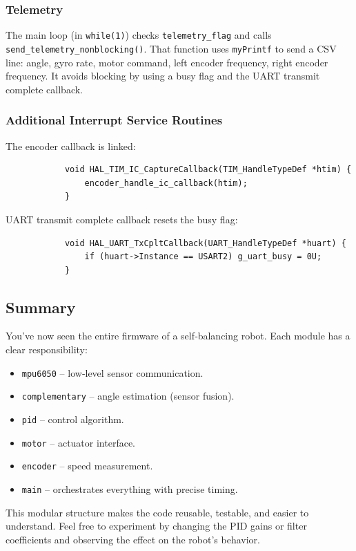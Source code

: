 \documentclass[12pt,a4paper]{article}
\begin{document}
		\subsubsection{Telemetry}
		The main loop (in \texttt{while(1)}) checks \texttt{telemetry\_flag} and calls \texttt{send\_telemetry\_nonblocking()}. That function uses \texttt{myPrintf} to send a CSV line: angle, gyro rate, motor command, left encoder frequency, right encoder frequency. It avoids blocking by using a busy flag and the UART transmit complete callback.
		
		\subsubsection{Additional Interrupt Service Routines}
		The encoder callback is linked:
		\begin{lstlisting}
			void HAL_TIM_IC_CaptureCallback(TIM_HandleTypeDef *htim) {
				encoder_handle_ic_callback(htim);
			}
		\end{lstlisting}
		
		UART transmit complete callback resets the busy flag:
		\begin{lstlisting}
			void HAL_UART_TxCpltCallback(UART_HandleTypeDef *huart) {
				if (huart->Instance == USART2) g_uart_busy = 0U;
			}
		\end{lstlisting}
		
		\subsection{Summary}
		You’ve now seen the entire firmware of a self‑balancing robot. Each module has a clear responsibility:
		\begin{itemize}
			\item \texttt{mpu6050} – low‑level sensor communication.
			\item \texttt{complementary} – angle estimation (sensor fusion).
			\item \texttt{pid} – control algorithm.
			\item \texttt{motor} – actuator interface.
			\item \texttt{encoder} – speed measurement.
			\item \texttt{main} – orchestrates everything with precise timing.
		\end{itemize}
		
		This modular structure makes the code reusable, testable, and easier to understand. Feel free to experiment by changing the PID gains or filter coefficients and observing the effect on the robot’s behavior.
	
	
\end{document}

